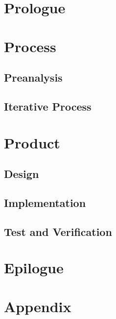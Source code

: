 

\part{Prologue}



\cleardoublepage
\part{Process}
\chapter{Preanalysis}

\chapter{Iterative Process} %

\part{Product}
\chapter{Design}

\chapter{Implementation}

\chapter{Test and Verification}

\part{Epilogue}


\part{Appendix} %

\appendix

